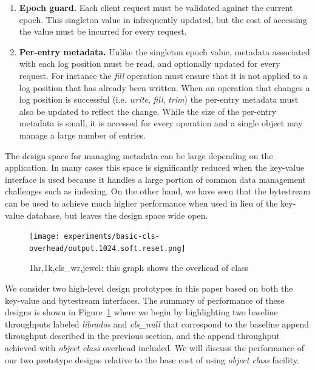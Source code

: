 \documentclass[10pt,twocolumn]{article}
\begin{document}
\begin{enumerate}
    \item {\bf Epoch guard.} Each client request must be validated against the
        current epoch. This singleton value in infrequently updated, but the
        cost of accessing the value must be incurred for every request.

    \item {\bf Per-entry metadata.} Unlike the singleton epoch value, metadata
        associated with each log position must be read, and optionally updated
        for every request. For instance the \emph{fill} operation must ensure
        that it is not applied to a log position that has already been
        written. When an operation that changes a log position is successful
        (i.e. \emph{write}, \emph{fill}, \emph{trim}) the per-entry metadata
        must also be updated to reflect the change. While the size of the
        per-entry metadata is small, it is accessed for every operation and a
        single object may manage a large number of entries.
\end{enumerate}

The design space for managing metadata can be large depending on the
application. In many cases this space is significantly reduced when the
key-value interface is used because it handles a large portion of common data
management challenges such as indexing. On the other hand, we have seen that
the bytestream can be used to achieve much higher performance when used in
lieu of the key-value database, but leaves the design space wide open.

\begin{figure}[t]
	\centering
	\texttt{[image: experiments/basic-cls-overhead/output.1024.soft.reset.png]}	
	\caption{1hr,1k,cls\_wr,jewel: this graph shows the overhead of class}
	\label{fig:cls_wr_jewel}
\end{figure}

We consider two high-level design prototypes in this paper based on both the
key-value and bytestream interfaces. The summary of performance of these
designs is shown in Figure~\ref{fig:cls_wr_jewel} where we begin by
highlighting two baseline throughputs labeled \emph{librados} and
\emph{cls\_null} that correspond to the baseline append throughput described
in the previous section, and the append throughput achieved with \emph{object
class} overhead included. We will discuss the performance of our two prototype
designs relative to the base cost of using \emph{object class} facility.
\end{document}
